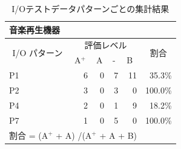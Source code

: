 \begin{table}[htbp]
  \centering
  \caption{I/Oテストデータパターンごとの集計結果}
    \begin{tabular}{lllllr}
    音楽再生機器 &       &       &       &       &  \bigstrut[b]\\
    \hline
    \multicolumn{1}{|c|}{\multirow{2}[4]{*}{I/O パターン}} & \multicolumn{4}{c|}{評価レベル}    & \multicolumn{1}{c|}{\multirow{2}[4]{*}{割合}} \bigstrut\\
\cline{2-5}    \multicolumn{1}{|c|}{} & \multicolumn{1}{l|}{A${}^\text{+}$} & \multicolumn{1}{l|}{A} & \multicolumn{1}{l|}{-} & \multicolumn{1}{l|}{B} & \multicolumn{1}{c|}{} \bigstrut\\
    \hline
    \multicolumn{1}{|l|}{P1} & \multicolumn{1}{r|}{6} & \multicolumn{1}{r|}{0} & \multicolumn{1}{r|}{7} & \multicolumn{1}{r|}{11} & \multicolumn{1}{r|}{35.3\%} \bigstrut\\
    \hline
    \multicolumn{1}{|l|}{P2} & \multicolumn{1}{r|}{3} & \multicolumn{1}{r|}{0} & \multicolumn{1}{r|}{3} & \multicolumn{1}{r|}{0} & \multicolumn{1}{r|}{100.0\%} \bigstrut\\
    \hline
    \multicolumn{1}{|l|}{P4} & \multicolumn{1}{r|}{2} & \multicolumn{1}{r|}{0} & \multicolumn{1}{r|}{1} & \multicolumn{1}{r|}{9} & \multicolumn{1}{r|}{18.2\%} \bigstrut\\
    \hline
    \multicolumn{1}{|l|}{P7} & \multicolumn{1}{r|}{1} & \multicolumn{1}{r|}{0} & \multicolumn{1}{r|}{5} & \multicolumn{1}{r|}{0} & \multicolumn{1}{r|}{100.0\%} \bigstrut\\
    \hline
    \multicolumn{5}{l}{割合 = (A${}^\text{+}$  +  A) /(A${}^\text{+}$  +  A + B) } &  \bigstrut[t]\\
    \end{tabular}%
\label{tbl:D-4-tbl9}%
\end{table}%

